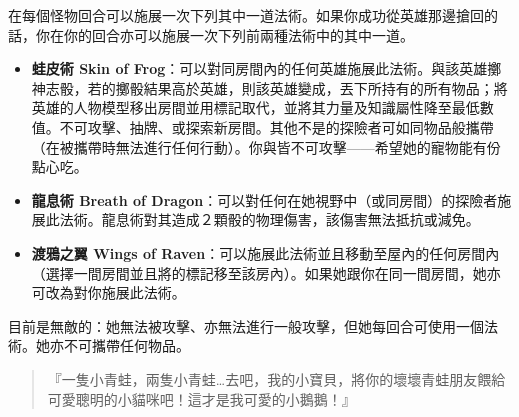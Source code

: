 在每個怪物回合可以施展一次下列其中一道法術。如果你成功從英雄那邊搶回的話，你在你的回合亦可以施展一次下列前兩種法術中的其中一道。
\begin{itemize}
  \item \textbf{蛙皮術 Skin of Frog}：可以對同房間內的任何英雄施展此法術。與該英雄擲神志骰，若的擲骰結果高於英雄，則該英雄變成，丟下所持有的所有物品；將英雄的人物模型移出房間並用標記取代，並將其力量及知識屬性降至最低數值。不可攻擊、抽牌、或探索新房間。其他不是的探險者可如同物品般攜帶（在被攜帶時無法進行任何行動）。你與皆不可攻擊——希望她的寵物能有份點心吃。
  \item \textbf{龍息術 Breath of Dragon}：可以對任何在她視野中（或同房間）的探險者施展此法術。龍息術對其造成２顆骰的物理傷害，該傷害無法抵抗或減免。
  \item \textbf{渡鴉之翼 Wings of Raven}：可以施展此法術並且移動至屋內的任何房間內（選擇一間房間並且將的標記移至該房內）。如果她跟你在同一間房間，她亦可改為對你施展此法術。
\end{itemize}

目前是無敵的：她無法被攻擊、亦無法進行一般攻擊，但她每回合可使用一個法術。她亦不可攜帶任何物品。

\begin{HauntStory}
  \begin{quote}
    『一隻小青蛙，兩隻小青蛙…去吧，我的小寶貝，將你的壞壞青蛙朋友餵給可愛聰明的小貓咪吧！這才是我可愛的小鵝鵝！』
  \end{quote}
\end{HauntStory}
